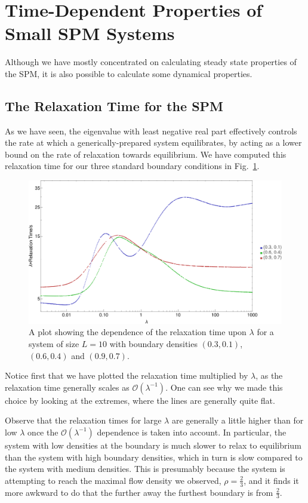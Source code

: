 \section{Time-Dependent Properties of Small SPM Systems}
Although we have mostly concentrated on calculating steady state properties of the SPM, it is also possible to calculate some dynamical properties. 
\subsection{The Relaxation Time for the SPM} \label{sec:relaxTime}
As we have seen, the eigenvalue with least negative real
part effectively controls the rate at which a generically-prepared system equilibrates, by acting as a
lower bound on the rate of relaxation towards equilibrium. We have computed this relaxation time for
our three standard boundary conditions in Fig.~\ref{fig:TRMRelaxTime}.
 \begin{figure}[h!]
 \caption[The dependence of the relaxation time on $\lambda$ for three sets of boundary conditions.]{\label{fig:TRMRelaxTime} 
A plot showing the dependence of the relaxation time upon $\lambda$ for a system of size $L=10$ with
boundary densities $(0.3, 0.1)$, $(0.6, 0.4)$ and $(0.9, 0.7)$.
 }
  \begin{center}
 \includegraphics[width=1.0\textwidth]{TRM/images/TRMRelaxTime}
  \end{center}
\end{figure}
Notice first that we have plotted the relaxation time multiplied by $\lambda$, as the relaxation time
generally scales as $\mathcal{O}(\lambda^{-1})$. One can see why we made this choice by looking at the
extremes, where the lines are generally quite flat.

Observe that the relaxation times for large $\lambda$ are generally a little higher than for low 
$\lambda$ once the $\mathcal{O}(\lambda^{-1})$ dependence is taken into account. In particular, the
system with low densities at the boundary is much slower to relax to equilibrium than the system with high boundary densities, which in turn is slow compared to the system with medium densities. This is
presumably because the system is attempting to reach the maximal flow density we observed, $\rho = \frac{2}{3}$, and it finds it more awkward to do that the further away the furthest boundary is from
$\frac{2}{3}$.

